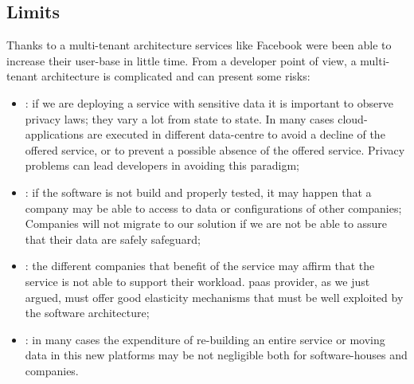 \subsection{Limits}
\label{sec:elasticity-multiTenancy-limits}
Thanks to a multi-tenant architecture services like Facebook were been able to increase their user-base
in little time. From a developer point of view, a multi-tenant architecture is complicated and can present
some risks:

\begin{itemize}
	\item{: if we are deploying a service with sensitive data it is important to
		observe privacy laws; they vary a lot from state to state. In many cases cloud-applications are
		executed in different data-centre to avoid a decline of the offered service, or to prevent a
		possible absence of the offered service. Privacy problems can lead developers in avoiding this paradigm;}
	\item{: if the software is not build and properly tested, it may happen that a
		company may be able to access to data or configurations of other companies; Companies will not migrate to
		our solution if we are not be able to assure that their data are safely safeguard;}
	\item{: the different companies that benefit of the service may affirm that
		the service is not able to support their workload. \ac{paas} provider, as we just argued, must offer
		good elasticity mechanisms that must be well exploited by the software architecture;}
	\item{: in many cases the expenditure of re-building
		an entire service or moving data in this new platforms may be not negligible both for software-houses and
		companies.}
\end{itemize}